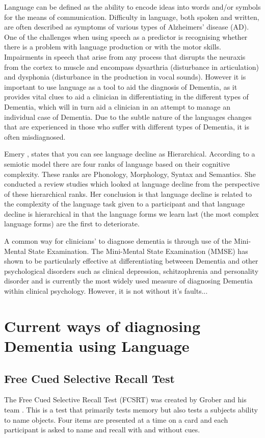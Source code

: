 \documentclass[a4paper]{article}
\begin{document}
Language can be defined as the ability to encode ideas into words and/or symbols for the means of communication. Difficulty in language, both spoken and written, are often described as symptoms of various types of Alzheimers' disease (AD). One of the challenges when using speech as a predictor is recognising whether there is a problem with language production or with the motor skills. Impairments in speech that arise from any process that disrupts the neuraxis from the cortex to muscle and encompass dysarthria (disturbance in articulation) and dysphonia (disturbance in the production in vocal sounds). However it is important to use language as a tool to aid the diagnosis of Dementia, as it provides vital clues to aid a clinician in differentiating in the different types of Dementia, which will in turn aid a clinician in an attempt to manage an individual case of Dementia. Due to the subtle nature of the languages changes that are experienced in those who suffer with different types of Dementia, it is often misdiagnosed.


Emery \cite{Emery2000}, states that you can see language decline as Hierarchical. According to a semiotic model there are four ranks of language based on their cognitive complexity. These ranks are Phonology, Morphology, Syntax and Semantics. She conducted a review studies which looked at language decline from the perspective of these hierarchical ranks. Her conclusion is that language decline is related to the complexity of the language task given to a participant and that language decline is hierarchical in that the language forms we learn last (the most complex language forms) are the first to deteriorate.

A common way for clinicians' to diagnose dementia is through use of the Mini-Mental State Examination. The Mini-Mental State Examination (MMSE) has shown to be particularly effective at differentiating betweeen Dementia and other psychological disorders such as clinical depression, schitzophrenia and personality disorder and is currently the most widely used measure of diagnosing Dementia within clinical psychology.  However, it is not without it's faults...

\section{Current ways of diagnosing Dementia using Language}
\subsection{Free Cued Selective Recall Test}
The Free Cued Selective Recall Test (FCSRT) was created by Grober and his team \cite{Grober1988}. This is a test that primarily tests memory but also tests a subjects ability to name objects. Four items are presented at a time on a card and each participant is asked to name and recall with and without cues. 
\end{document}
